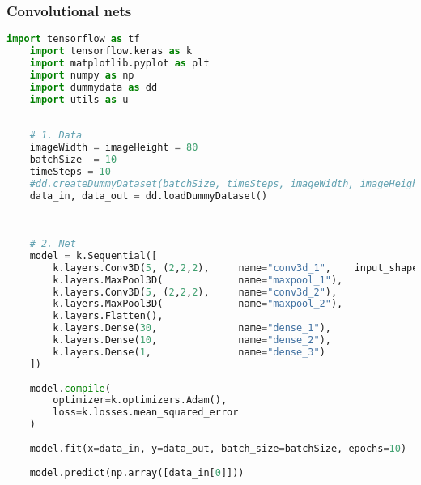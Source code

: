 \subsubsection{Convolutional nets}
\begin{lstlisting}[language=python]
    import tensorflow as tf
    import tensorflow.keras as k
    import matplotlib.pyplot as plt
    import numpy as np
    import dummydata as dd
    import utils as u
    
    
    # 1. Data
    imageWidth = imageHeight = 80
    batchSize  = 10
    timeSteps = 10
    #dd.createDummyDataset(batchSize, timeSteps, imageWidth, imageHeight)
    data_in, data_out = dd.loadDummyDataset()
    
    
    
    # 2. Net
    model = k.Sequential([
        k.layers.Conv3D(5, (2,2,2),     name="conv3d_1",    input_shape=(timeSteps, imageWidth, imageHeight, 1)),
        k.layers.MaxPool3D(             name="maxpool_1"),
        k.layers.Conv3D(5, (2,2,2),     name="conv3d_2"),
        k.layers.MaxPool3D(             name="maxpool_2"),
        k.layers.Flatten(),
        k.layers.Dense(30,              name="dense_1"),
        k.layers.Dense(10,              name="dense_2"),
        k.layers.Dense(1,               name="dense_3")
    ])
    
    model.compile(
        optimizer=k.optimizers.Adam(),
        loss=k.losses.mean_squared_error
    )
    
    model.fit(x=data_in, y=data_out, batch_size=batchSize, epochs=10)
    
    model.predict(np.array([data_in[0]]))
    
\end{lstlisting}


